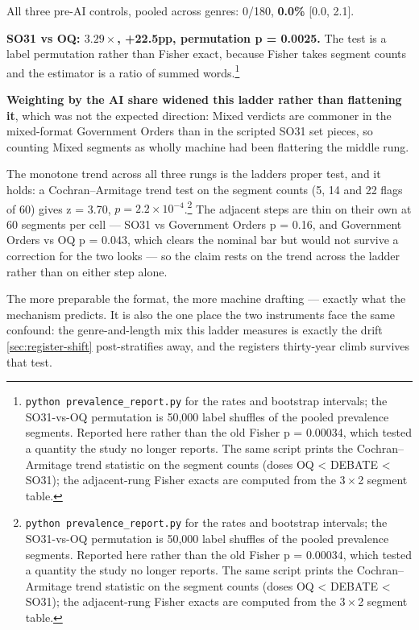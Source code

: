 All three pre-AI controls, pooled across genres: 0/180, \textbf{0.0\%} {[}0.0, 2.1{]}.

\textbf{SO31 vs OQ: \(3.29\times\), +22.5pp, permutation p = 0.0025.} The test is a label
permutation rather than Fisher exact, because Fisher takes segment counts and
the estimator is a ratio of summed words.\footnote{\texttt{python\ prevalence\_\allowbreak{}report.\allowbreak{}py} for the rates and bootstrap intervals;
  the SO31-vs-OQ permutation is 50,000 label shuffles of the pooled
  prevalence segments. Reported here rather than the old Fisher p = 0.00034,
  which tested a quantity the study no longer reports. The same script prints
  the Cochran--Armitage trend statistic on the segment counts (doses
  OQ \textless{} DEBATE \textless{} SO31); the adjacent-rung Fisher exacts are computed from the
  \(3\times\)2 segment table.}

\textbf{Weighting by the AI share widened this ladder rather than flattening it},
which was not the expected direction: Mixed verdicts are commoner in the
mixed-format Government Orders than in the scripted SO31 set pieces, so
counting Mixed segments as wholly machine had been flattering the middle rung.

The monotone trend across all three rungs is the ladder\textquotesingle s proper test, and it
holds: a Cochran--Armitage trend test on the segment counts (5, 14 and 22 flags
of 60) gives z = 3.70, \(p = 2.2\times 10^{-4}\).\footnote{\texttt{python\ prevalence\_\allowbreak{}report.\allowbreak{}py} for the rates and bootstrap intervals;
  the SO31-vs-OQ permutation is 50,000 label shuffles of the pooled
  prevalence segments. Reported here rather than the old Fisher p = 0.00034,
  which tested a quantity the study no longer reports. The same script prints
  the Cochran--Armitage trend statistic on the segment counts (doses
  OQ \textless{} DEBATE \textless{} SO31); the adjacent-rung Fisher exacts are computed from the
  \(3\times\)2 segment table.} The adjacent steps are thin on
their own at 60 segments per cell --- SO31 vs Government Orders p = 0.16, and
Government Orders vs OQ p = 0.043, which clears the nominal bar but would not
survive a correction for the two looks --- so the claim rests on the trend
across the ladder rather than on either step alone.

The more preparable the format, the more machine drafting --- exactly what the
mechanism predicts. It is also the one place the two instruments face the
same confound: the genre-and-length mix this ladder measures is exactly the
drift \cref{sec:register-shift} post-stratifies away, and the register\textquotesingle s thirty-year climb
survives that test.

